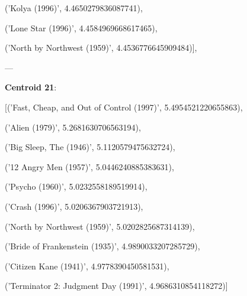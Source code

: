 \documentclass[11pt]{article}
\begin{document}
      ('Kolya (1996)', 4.4650279836087741),
 
      ('Lone Star (1996)', 4.4584969668617465),
 
      ('North by Northwest (1959)', 4.4536776645909484)],
      
      ---
 
\textbf{Centroid 21}:
 
 [('Fast, Cheap, and Out of Control (1997)', 5.4954521220655863),
 
      ('Alien (1979)', 5.2681630706563194),
 
      ('Big Sleep, The (1946)', 5.1120579475632724),
 
      ('12 Angry Men (1957)', 5.0446240885383631),
 
      ('Psycho (1960)', 5.0232558189519914),
 
      ('Crash (1996)', 5.0206367903721913),
 
      ('North by Northwest (1959)', 5.0202825687314139),
 
      ('Bride of Frankenstein (1935)', 4.9890033207285729),
 
      ('Citizen Kane (1941)', 4.9778390450581531),
 
      ('Terminator 2: Judgment Day (1991)', 4.9686310854118272)]
\end{document}
